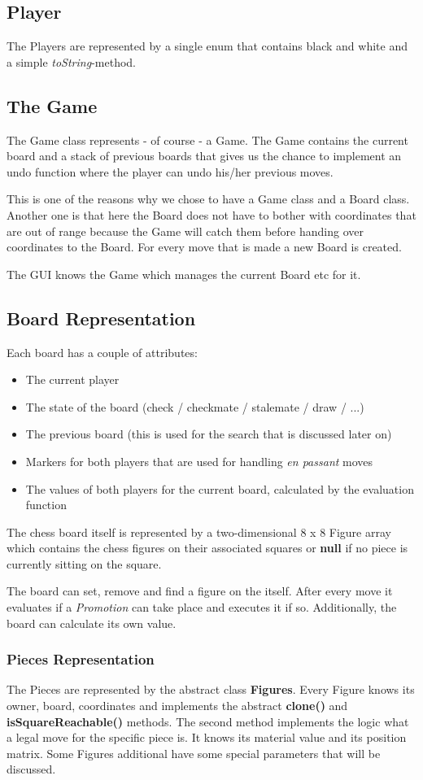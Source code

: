 \documentclass[final, paper=a4, paper=portrait, pagesize=auto, fontsize=10pt,english]{scrartcl}
\begin{document}
\subsection{Player}
The Players are represented by a single enum that contains black and white and a simple \textit{toString}-method. 
\subsection{The Game}
The Game class represents - of course - a Game. The Game contains the current board and a stack of previous boards that gives us the chance to implement an undo function where the player can undo his/her previous moves. 

This is one of the reasons why we chose to have a Game class and a Board class. Another one is that here the Board does not have to bother with coordinates that are out of range because the Game will catch them before handing over coordinates to the Board. For every move that is made a new Board is created. 

The GUI knows the Game which manages the current Board etc for it.
\subsection{Board Representation}
Each board has a couple of attributes:
\begin{itemize}
\item The current player
\item The state of the board (check / checkmate / stalemate / draw / ...)
\item The previous board (this is used for the search that is discussed later on)
\item Markers for both players that are used for handling \textit{en passant} moves
\item The values of both players for the current board, calculated by the evaluation function
\end{itemize}
The chess board itself is represented by a two-dimensional 8 x 8 Figure array which contains the chess figures on their associated squares or \textbf{null} if no piece is currently sitting on the square.

The board can set, remove and find a figure on the itself. After every move it evaluates if a \textit{Promotion} can take place and executes it if so. 
Additionally, the board can calculate its own value.

\subsubsection{Pieces Representation}	
The Pieces are represented by the abstract class \textbf{Figures}. Every Figure knows its owner, board, coordinates and implements the abstract \textbf{clone()} and \textbf{isSquareReachable()} methods. The second method implements the logic what a legal move for the specific piece is. It knows its material value and its position matrix. Some Figures additional have some special parameters that will be discussed.\\
\end{document}
